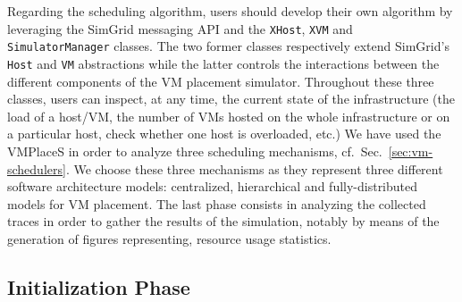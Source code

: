 \documentclass[conference]{IEEEtran}
\newcommand{\sg}{SimGrid\xspace}
\newcommand{\vmps}{VMPlaceS\xspace}
\begin{document}
Regarding the scheduling algorithm, users should develop their own
algorithm by leveraging the \sg messaging API and the \texttt{XHost},
\texttt{XVM} and \texttt{SimulatorManager} classes. The two former
classes respectively extend \sg's \texttt{Host} and \texttt{VM}
abstractions while the latter controls the interactions between the
different components of the VM placement simulator.  Throughout these
three classes, users can inspect, at any time, the current state of
the infrastructure (\ie the load of a host/VM, the number of VMs
hosted on the whole infrastructure or on a particular host, check
whether one host is overloaded, etc.) We have used the \vmps in order
to analyze three scheduling mechanisms, cf.\
Sec.~\ref{sec:vm-schedulers}. We choose these three mechanisms as they
represent three different software architecture models: centralized,
hierarchical and fully-distributed models for VM placement.
The last phase consists in analyzing the collected traces in order to
gather the results of the simulation, notably by means of the
generation of figures representing, \eg resource usage statistics.


\subsection{Initialization Phase}
\end{document}
